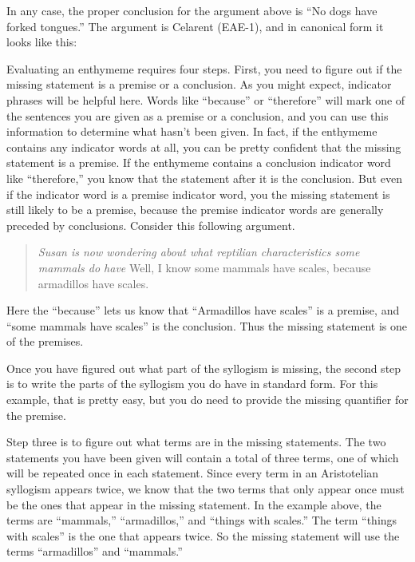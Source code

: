 In any case, the proper conclusion for the argument above is ``No dogs have forked tongues.'' The argument is Celarent (EAE-1), and in canonical form it looks like this:

\begin{kormanize}
\end{kormanize}


Evaluating an enthymeme requires four steps. First, you need to figure out if the missing statement is a premise or a conclusion. As you might expect, indicator phrases will be helpful here. Words like ``because'' or ``therefore'' will mark one of the sentences you are given as a premise or a conclusion, and you can use this information to determine what hasn't been given. In fact, if the enthymeme contains any indicator words at all, you can be pretty confident that the missing statement is a premise. If the enthymeme contains a conclusion indicator word like ``therefore,'' you know that the statement after it is the conclusion. But even if the indicator word is a premise indicator word, you the missing statement is still likely to be a premise, because the premise indicator words are generally preceded by conclusions. Consider this following argument.

\begin{quotation} \noindent\textit{Susan is now wondering about what reptilian characteristics some mammals do have} Well, I know some mammals have scales, because armadillos have scales. \end{quotation}

 Here the ``because'' lets us know that  ``Armadillos have scales'' is a premise, and ``some mammals have scales'' is the conclusion. Thus the missing statement is one of the premises.

Once you have figured out what part of the syllogism is missing, the second step is to write the parts of the syllogism you do have in standard form. For this example, that is pretty easy, but you do need to provide the missing quantifier for the premise.

\begin{kormanize}
\end{kormanize}

 Step three is to figure out what terms are in the missing statements. The two statements you have been given will contain a total of three terms, one of which will be repeated once in each statement. Since every term in an Aristotelian syllogism appears twice, we know that the two terms that only appear once must be the ones that appear in the missing statement. In the example above, the terms are ``mammals,'' ``armadillos,'' and ``things with scales.'' The term ``things with scales'' is the one that appears twice. So the missing statement will use the terms ``armadillos'' and ``mammals.''

